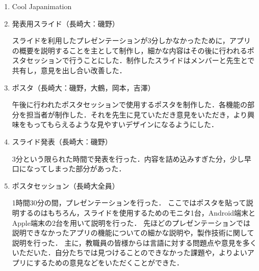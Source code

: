\begin{enumerate}
\item Cool Japanimation
\par
\item 発表用スライド（長崎大：磯野）
\par
スライドを利用したプレゼンテーションが3分しかなかったために，アプリの概要を説明することを主として制作し，細かな内容はその後に行われるポスタセッションで行うことにした．制作したスライドはメンバーと先生とで共有し，意見を出し合い改善した．
\item ポスタ（長崎大：磯野，大鶴，岡本，吉澤）
\par
午後に行われたポスタセッションで使用するポスタを制作した．各機能の部分を担当者が制作した．それを先生に見ていただき意見をいただき，より興味をもってもらえるような見やすいデザインになるようにした．
\item スライド発表（長崎大：磯野）
\par
3分という限られた時間で発表を行った．内容を詰め込みすぎた分，少し早口になってしまった部分があった．
\item ポスタセッション（長崎大全員）
\par
1時間30分の間，プレゼンテーションを行った．
ここではポスタを貼って説明するのはもちろん，スライドを使用するためのモニタ1台，Android端末とApple端末の2台を用いて説明を行った．
先ほどのプレゼンテーションでは説明できなかったアプリの機能についての細かな説明や，製作技術に関して説明を行った．
主に，教職員の皆様からは言語に対する問題点や意見を多くいただいた．自分たちでは見つけることのできなかった課題や，よりよいアプリにするための意見などをいただくことができた．
\end{enumerate}　
\par
{}

